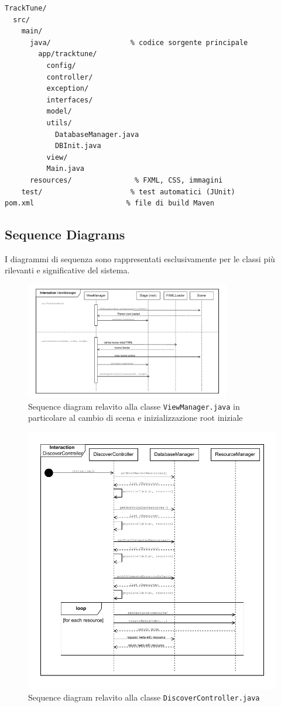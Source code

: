 \documentclass[a4paper]{article}
\begin{document}
\begin{lstlisting}[style=filetree]
TrackTune/
  src/
    main/
      java/                   % codice sorgente principale
        app/tracktune/
          config/
          controller/
          exception/
          interfaces/
          model/
          utils/
            DatabaseManager.java
            DBInit.java
          view/
          Main.java
      resources/               % FXML, CSS, immagini
    test/                     % test automatici (JUnit)
pom.xml                      % file di build Maven
\end{lstlisting}

\subsection{Sequence Diagrams}
I diagrammi di sequenza sono rappresentati esclusivamente per le classi più rilevanti e significative del sistema.

\begin{figure}[H]
    \centering
    \includegraphics[width=0.8\textwidth]{./figures/viewManager_sd}
    \caption{Sequence diagram relavito alla classe \texttt{ViewManager.java} in particolare al cambio di scena e inizializzazione root iniziale}
    \label{fig:viewmanager_sd}
\end{figure}

\begin{figure}[H]
    \centering
    \includegraphics[width=0.8 \textwidth]{./figures/discoverController_sd}
    \caption{Sequence diagram relavito alla classe \texttt{DiscoverController.java}}
    \label{fig:discovercontroller_sd}
\end{figure}
\end{document}
